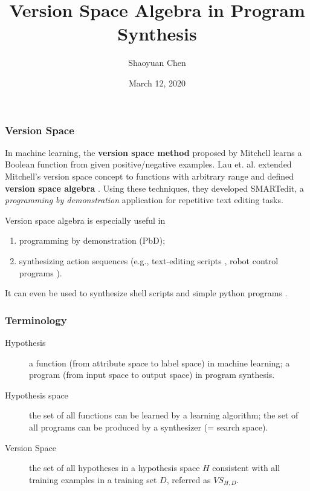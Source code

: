 \documentclass{beamer}
\title[VSA in Program Synthesis]{Version Space Algebra in Program Synthesis}
\institute[SPAR PL4SE]{SPAR PL4SE, Institute of Computer Software, Nanjing University}
\author{Shaoyuan Chen}
\date{March 12, 2020}
\begin{document}
\begin{frame}
	\titlepage
\end{frame}


\begin{frame}
	\frametitle{Version Space}
	In machine learning, the \textbf{version space method} proposed by Mitchell \cite{mitchell} learns a Boolean function from given positive/negative examples. Lau et. al. extended Mitchell's version space concept to functions with arbitrary range and defined \textbf{version space algebra} \cite{lau}. Using these techniques, they developed SMARTedit, a \textit{programming by demonstration} application for repetitive text editing tasks.
	
	\pause
	
	Version space algebra is especially useful in
	\begin{enumerate}
		\item programming by demonstration (PbD);
		\item synthesizing action sequences (e.g., text-editing scripts \cite{mitchell}, robot control programs \cite{pardowitz}).
	\end{enumerate}
	It can even be used to synthesize shell scripts \cite{shell} and simple python programs \cite{python}.
\end{frame}

\begin{frame}
\frametitle{Terminology}
\begin{description}
	\item[Hypothesis] a function (from attribute space to label space) in machine learning; a program (from input space to output space) in program synthesis. 
	\item[Hypothesis space] the set of all functions can be learned by a learning algorithm; the set of all programs can be produced by a synthesizer (= search space).
	\item[Version Space] the set of all hypotheses in a hypothesis space $H$ consistent with all training examples in a training set $D$, referred as $VS_{H, D}$. 
\end{description}
\end{frame}
\end{document}

